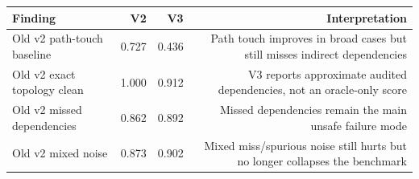 \begin{tabular}{lrrr}
\toprule
Finding & V2 & V3 & Interpretation \\
\midrule
Old v2 path-touch baseline & 0.727 & 0.436 & Path touch improves in broad cases but still misses indirect dependencies \\
Old v2 exact topology clean & 1.000 & 0.912 & V3 reports approximate audited dependencies, not an oracle-only score \\
Old v2 missed dependencies & 0.862 & 0.892 & Missed dependencies remain the main unsafe failure mode \\
Old v2 mixed noise & 0.873 & 0.902 & Mixed miss/spurious noise still hurts but no longer collapses the benchmark \\
\bottomrule
\end{tabular}
